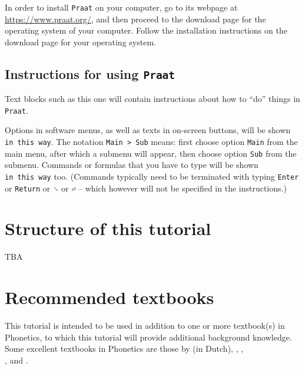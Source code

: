 \documentclass[
]{book}
\begin{document}
In order to install \texttt{Praat} on your computer, go to its webpage at \url{https://www.praat.org/}, and then proceed to the download page for the operating system of your computer. Follow the installation instructions on the download page for your operating system.

\label{tech-layout}
\subsection*{\texorpdfstring{Instructions for using \texttt{Praat}}{Instructions for using Praat}}\label{instructions-for-using-praat}

Text blocks such as this one will contain instructions about how to ``do'' things in \texttt{Praat}.

Options in software menus, as well as texts in on-screen buttons, will be shown \texttt{in\ this\ way}.
The notation \texttt{Main\ \textgreater{}\ Sub} means: first choose option \texttt{Main} from the main menu, after which a submenu will appear, then choose option \texttt{Sub} from the submenu.
Commands or formulas that you have to type will be shown \texttt{in\ this\ way} too. (Commands typically need to be terminated with typing \texttt{Enter} or \texttt{Return} or \texttt{␍} or \texttt{⏎} -- which however will not be specified in the instructions.)

\section*{Structure of this tutorial}\label{structure-of-this-tutorial}

TBA

\section*{Recommended textbooks}\label{recommended-textbooks}

This tutorial is intended to be used in addition to one or more textbook(s) in Phonetics, to which this tutorial will provide additional background knowledge. Some excellent textbooks in Phonetics are those by
\citet{Rietveld_VanHeuven_2009} (in Dutch),
\citet{Johnson_2012},
\citet{Ladefoged_Johnson_2015},\\
\citet{Reetz_Jongman_2020}, and
\citet{Zsiga_2024}.
\end{document}
